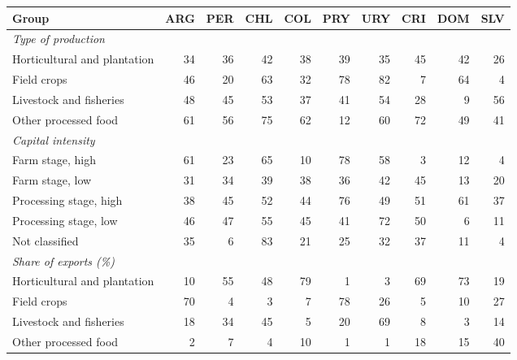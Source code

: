 \begin{tabular}{lrrrrrrrrr}
\toprule
Group & ARG & PER & CHL & COL & PRY & URY & CRI & DOM & SLV \\
\midrule
\textit{Type of production} &  &  &  &  &  &  &  &  &  \\
Horticultural and plantation & 34 & 36 & 42 & 38 & 39 & 35 & 45 & 42 & 26 \\
Field crops & 46 & 20 & 63 & 32 & 78 & 82 & 7 & 64 & 4 \\
Livestock and fisheries & 48 & 45 & 53 & 37 & 41 & 54 & 28 & 9 & 56 \\
Other processed food & 61 & 56 & 75 & 62 & 12 & 60 & 72 & 49 & 41 \\
\textit{Capital intensity} &  &  &  &  &  &  &  &  &  \\
Farm stage, high & 61 & 23 & 65 & 10 & 78 & 58 & 3 & 12 & 4 \\
Farm stage, low & 31 & 34 & 39 & 38 & 36 & 42 & 45 & 13 & 20 \\
Processing stage, high & 38 & 45 & 52 & 44 & 76 & 49 & 51 & 61 & 37 \\
Processing stage, low & 46 & 47 & 55 & 45 & 41 & 72 & 50 & 6 & 11 \\
Not classified & 35 & 6 & 83 & 21 & 25 & 32 & 37 & 11 & 4 \\
\textit{Share of exports (\%)} &  &  &  &  &  &  &  &  &  \\
Horticultural and plantation & 10 & 55 & 48 & 79 & 1 & 3 & 69 & 73 & 19 \\
Field crops & 70 & 4 & 3 & 7 & 78 & 26 & 5 & 10 & 27 \\
Livestock and fisheries & 18 & 34 & 45 & 5 & 20 & 69 & 8 & 3 & 14 \\
Other processed food & 2 & 7 & 4 & 10 & 1 & 1 & 18 & 15 & 40 \\
\bottomrule
\end{tabular}
